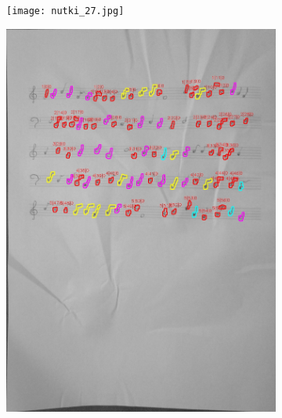 \documentclass[11pt]{article}
\begin{document}
\begin{figure}[H]
    \centering
    \begin{subfigure}{.5\textwidth}
        \centering
        \graphicspath{ {Resources/} }
        \texttt{[image: nutki\_27.jpg]}
        \label{fig:sub1}
    \end{subfigure}%
    \begin{subfigure}{.5\textwidth}
        \centering
        \graphicspath{ {blobs/} }
        \includegraphics[width=\linewidth]{27_cnts.jpg}
        \label{fig:sub2}
    \end{subfigure}
    \label{fig:test}
\end{figure}
\end{document}
